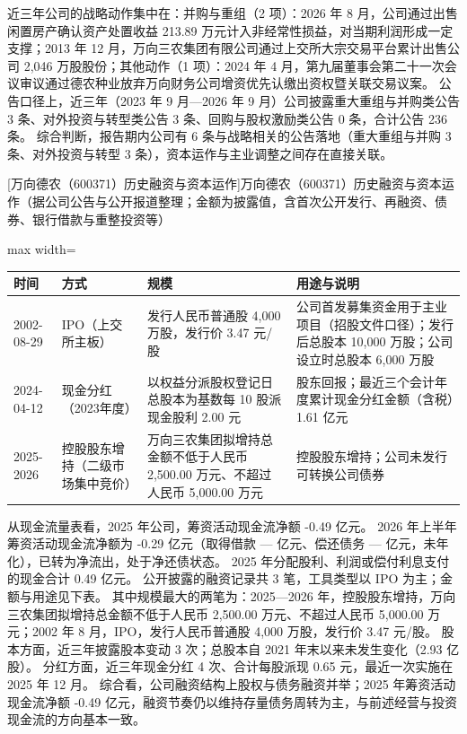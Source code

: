  近三年公司的战略动作集中在：并购与重组（2 项）：2026 年 8 月，公司通过出售闲置房产确认资产处置收益 213.89 万元计入非经常性损益，对当期利润形成一定支撑；2013 年 12 月，万向三农集团有限公司通过上交所大宗交易平台累计出售公司 2,046 万股股份；其他动作（1 项）：2024 年 4 月，第九届董事会第二十一次会议审议通过德农种业放弃万向财务公司增资优先认缴出资权暨关联交易议案。 公告口径上，近三年（2023 年 9 月---2026 年 9 月）公司披露重大重组与并购类公告 3 条、对外投资与转型类公告 3 条、回购与股权激励类公告 0 条，合计公告 236 条。 综合判断，报告期内公司有 6 条与战略相关的公告落地（重大重组与并购 3 条、对外投资与转型 3 条），资本运作与主业调整之间存在直接关联。

\begin{center}\small\setlength{\tabcolsep}{4pt}
[万向德农（600371）历史融资与资本运作]{万向德农（600371）历史融资与资本运作（据公司公告与公开报道整理；金额为披露值，含首次公开发行、再融资、债券、银行借款与重整投资等）}
\begin{adjustbox}{max width=\textwidth}
\begin{tabular}{@{}p{1.45cm}p{2.55cm}p{4.05cm}p{4.95cm}@{}}
\toprule
时间 & 方式 & 规模 & 用途与说明 \\
\midrule
2002-08-29 & IPO（上交所主板） & 发行人民币普通股 4,\allowbreak{}000 万股，\allowbreak{}发行价 3.47 元/\allowbreak{}股 & 公司首发募集资金用于主业项目（招股文件口径）；发行后总股本 10,\allowbreak{}000 万股；公司设立时总股本 6,\allowbreak{}000 万股 \\
2024-04-12 & 现金分红（2023年度） & 以权益分派股权登记日总股本为基数每 10 股派现金股利 2.00 元 & 股东回报；最近三个会计年度累计现金分红金额（含税）1.61 亿元 \\
2025-2026 & 控股股东增持（二级市场集中竞价） & 万向三农集团拟增持总金额不低于人民币 2,\allowbreak{}500.00 万元、\allowbreak{}不超过人民币 5,\allowbreak{}000.00 万元 & 控股股东增持；公司未发行可转换公司债券 \\
\bottomrule
\end{tabular}
\end{adjustbox}
\end{center}

 从现金流量表看，2025 年公司，筹资活动现金流净额 -0.49 亿元。 2026 年上半年筹资活动现金流净额为 -0.29 亿元（取得借款 — 亿元、偿还债务 — 亿元，未年化），已转为净流出，处于净还债状态。 2025 年分配股利、利润或偿付利息支付的现金合计 0.49 亿元。 公开披露的融资记录共 3 笔，工具类型以 IPO 为主；金额与用途见下表。 其中规模最大的两笔为：2025---2026 年，控股股东增持，万向三农集团拟增持总金额不低于人民币 2,500.00 万元、不超过人民币 5,000.00 万元；2002 年 8 月，IPO，发行人民币普通股 4,000 万股，发行价 3.47 元/股。 股本方面，近三年披露股本变动 3 次；总股本自 2021 年末以来未发生变化（2.93 亿股）。 分红方面，近三年现金分红 4 次、合计每股派现 0.65 元，最近一次实施在 2025 年 12 月。 综合看，公司融资结构上股权与债务融资并举；2025 年筹资活动现金流净额 -0.49 亿元，融资节奏仍以维持存量债务周转为主，与前述经营与投资现金流的方向基本一致。

